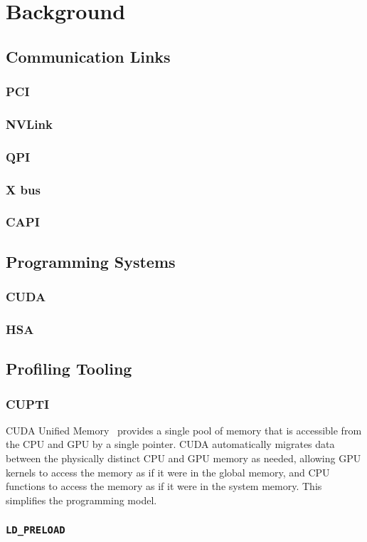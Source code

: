 \chapter{Background}


%
%
%
\section{Communication Links}

\subsection{PCI}
\subsection{NVLink}
\subsection{QPI}
\subsection{X bus}
\subsection{CAPI}

%
%
%
\section{Programming Systems}
\subsection{CUDA}
\label{sec:cuda}
\subsection{HSA}
\label{sec:hsa}


%
%
%
\section{Profiling Tooling}

\subsection{CUPTI}
\label{sec:cupti}

\cite{nvidia2017cupti}

CUDA Unified Memory~\cite{harris2013cudaunifiedmemory} provides a single pool of memory that is accessible from the CPU and GPU by a single pointer.
CUDA automatically migrates data between the physically distinct CPU and GPU memory as needed, allowing GPU kernels to access the memory as if it were in the global memory, and CPU functions to access the memory as if it were in the system memory.
This simplifies the programming model.

\subsection{\texttt{LD\_PRELOAD}}
\label{sec:ldpreload}

\cite{kerrisk2017ld}

